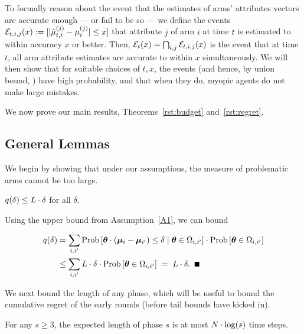 To formally reason about the event that the estimates of arms'
attributes vectors are accurate enough --- or fail to be so ---
we define the events
${\mathcal E}_{t,i,j}(x) := [|\hat{\mu}_{t,i}^{(j)} - \mu_{i}^{(j)}| \leq x]$
that attribute $j$ of arm $i$ at time $t$ is estimated to
within accuracy $x$ or better.
Then, 
${\mathcal E}_{t}(x) = \bigcap_{i,j} {\mathcal E}_{t,i,j}(x)$
is the event that at time $t$, all arm attribute
estimates are accurate to within $x$ simultaneously.
We will then show that for suitable choices of $t, x$,
the events 
(and hence, by union bound, )
have high probability,
and that when they do, myopic agents do not make large mistakes.

We now prove our main results, Theorems~\ref{rst:budget} and~\ref{rst:regret}.

\subsection{General Lemmas}

We begin by showing that under our assumptions, the measure of
problematic arms cannot be too large.

\begin{lemma} \label{lem:sdelta}
$q(\delta) \leq L \cdot \delta$ for all $\delta$.
\end{lemma}

\begin{emptyproof}
Using the upper bound from Assumption~\ref{A1}, we can bound

\begin{align*}
\AlmostTied{\delta}
& = \sum_{i,i'} \ProbC{\AgV \cdot (\ArmV{i} - \ArmV{i'}) \leq \delta}%
    {\AgV \in \FirstTwo{i}{i'}}
  \cdot \Prob{\AgV \in \FirstTwo{i}{i'}}\\
& \leq \sum_{i,i'} \TieDensity \cdot \delta
    \cdot \Prob{\AgV \in \FirstTwo{i}{i'}}
\; = \; \TieDensity \cdot \delta. \QED
\end{align*}
\end{emptyproof}

We next bound the length of any phase, which will be useful to bound
the cumulative regret of the early rounds
(before tail bounds have kicked in).

\begin{lemma} \label{lem:phase-length}
For any $s\geq 3$, the expected length of phase $s$ is at most
$N \cdot \log(s)$ time steps.
\end{lemma}

